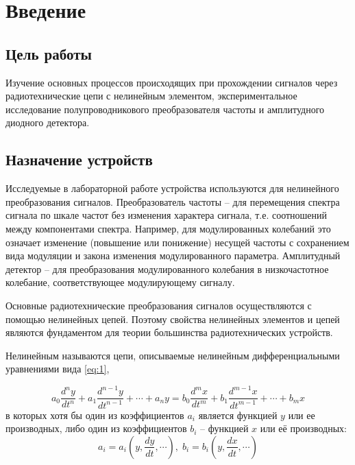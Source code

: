


\def\labauthors{Виноградов И.Д., Понур К.А., Шиков А.П.}
\def\labgroup{430}
\def\labnumber{x}
\def\labtheme{Нелинейные преобразования сигналов}
\renewcommand{\vec}{\mathbf}
\renewcommand{\Re}{\operatorname{Re}}
\renewcommand{\Im}{\operatorname{Im}}
\renewcommand{\phi}{\varphi}
\renewcommand{\hat}{\widehat}



\tableofcontents
\newpage
\section{Введение}

\subsection*{Цель работы}
Изучение основных процессов происходящих при прохождении сигналов через радиотехнические цепи с нелинейным элементом, экспериментальное исследование полупроводникового преобразователя частоты и амплитудного диодного детектора.
\subsection*{Назначение устройств}
Исследуемые в лабораторной работе устройства используются для нелинейного преобразования сигналов. Преобразователь частоты -- для перемещения спектра сигнала по шкале частот без изменения характера сигнала, т.е. соотношений между компонентами спектра. Например, для модулированных колебаний это означает изменение (повышение или понижение) несущей частоты с сохранением вида модуляции и закона изменения модулированного параметра. Амплитудный детектор -- для преобразования модулированного колебания в низкочастотное колебание, соответствующее модулирующему сигналу.

Основные радиотехнические преобразования сигналов осуществляются с помощью нелинейных цепей. Поэтому свойства нелинейных элементов и цепей являются фундаментом для теории большинства радиотехнических устройств.

Нелинейным называются цепи, описываемые нелинейным дифференциальными уравнениями вида \eqref{eq:1},

\begin{equation}
a_0\frac{d^ny}{dt^n}+a_1\frac{d^{n-1}y}{dt^{n-1}}+\cdots+a_ny=b_0\frac{d^mx}{dt^m}+b_1\frac{d^{m-1}x}{dt^{m-1}}+\cdots+b_mx
\label{eq:1}
\end{equation}
в которых хотя бы один из коэффициентов $a_i$ является функцией $y$ или ее производных, либо один из коэффициентов $b_i$ -- функцией $x$ или её производных:
\begin{equation*}
a_i=a_i(y,\frac{dy}{dt},\cdots),\;b_i=b_i(y,\frac{dx}{dt},\cdots)
\end{equation*}

